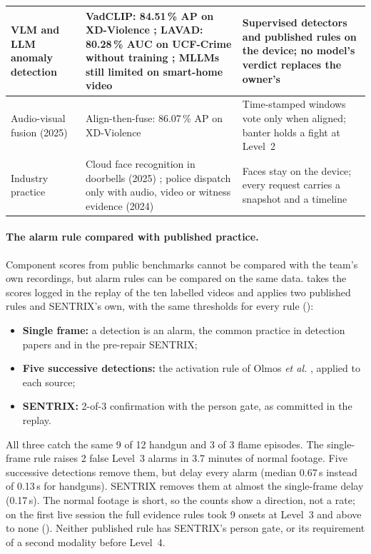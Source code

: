 \begin{table}[htbp]
\begin{tabularx}{\textwidth}{|L{2.4cm}|Y|Y|}
VLM and LLM anomaly detection & VadCLIP: 84.51\,\% AP on XD-Violence \cite{wu2024vadclip}; LAVAD: 80.28\,\% AUC on UCF-Crime without training \cite{zanella2024lavad}; MLLMs still limited on smart-home video \cite{zhao2025smarthomebench} & Supervised detectors and published rules on the device; no model's verdict replaces the owner's\\ \hline
Audio-visual fusion (2025) & Align-then-fuse: 86.07\,\% AP on XD-Violence \cite{jin2025aligning} & Time-stamped windows vote only when aligned; banter holds a fight at Level~2\\ \hline
Industry practice & Cloud face recognition in doorbells (2025) \cite{perez2025ringfaces}; police dispatch only with audio, video or witness evidence (2024) \cite{seattle2024alarm} & Faces stay on the device; every request carries a snapshot and a timeline\\ \hline
\end{tabularx}
\end{table}

\paragraph{The alarm rule compared with published practice.} Component scores from public benchmarks cannot be compared with the team's own recordings, but alarm rules can be compared on the same data.  takes the scores logged in the replay of the ten labelled videos and applies two published rules and SENTRIX's own, with the same thresholds for every rule ():
\begin{itemize}
\item \textbf{Single frame:} a detection is an alarm, the common practice in detection papers and in the pre-repair SENTRIX;
\item \textbf{Five successive detections:} the activation rule of Olmos \emph{et al.} \cite{olmos2018handgun}, applied to each source;
\item \textbf{SENTRIX:} 2-of-3 confirmation with the person gate, as committed in the replay.
\end{itemize}
All three catch the same 9 of 12 handgun and 3 of 3 flame episodes. The single-frame rule raises 2 false Level~3 alarms in 3.7 minutes of normal footage. Five successive detections remove them, but delay every alarm (median 0.67\,s instead of 0.13\,s for handguns). SENTRIX removes them at almost the single-frame delay (0.17\,s). The normal footage is short, so the counts show a direction, not a rate; on the first live session the full evidence rules took 9 onsets at Level~3 and above to none (). Neither published rule has SENTRIX's person gate, or its requirement of a second modality before Level~4.

